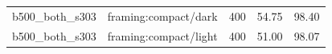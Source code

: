 \begin{longtable}{l>{\raggedright\arraybackslash}p{.42\linewidth}rrr}
b500\_\allowbreak{}both\_\allowbreak{}s303 & %
framing:compact/dark & %
400 & %
54.75 & %
98.40 \\ %

b500\_\allowbreak{}both\_\allowbreak{}s303 & %
framing:compact/light & %
400 & %
51.00 & %
98.07 \\ %


\end{longtable}
